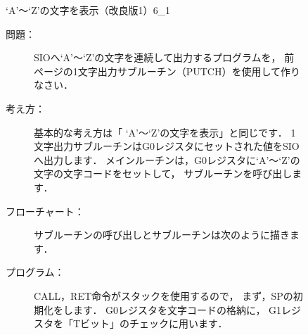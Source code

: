\begin{figure}[btp]
\begin{reidai}{`A'〜`Z'の文字を表示（改良版1）}{6_1}
\begin{description}
\item[問題：] SIOへ`A'〜`Z'の文字を連続して出力するプログラムを，
前ページの1文字出力サブルーチン（PUTCH）を使用して作りなさい．

\item[考え方：]
基本的な考え方は「 `A'〜`Z'の文字を表示」と同じです．
1文字出力サブルーチンはG0レジスタにセットされた値をSIOへ出力します．
メインルーチンは，G0レジスタに`A'〜`Z'の文字の文字コードをセットして，
サブルーチンを呼び出します．

\item[フローチャート：]
サブルーチンの呼び出しとサブルーチンは次のように描きます．

\begin{center}
\end{center}

\item[プログラム：]
CALL，RET命令がスタックを使用するので，
まず，SPの初期化をします．
G0レジスタを文字コードの格納に，
G1レジスタを「Tビット」のチェックに用います．


\end{description}
\end{reidai}
\end{figure}
